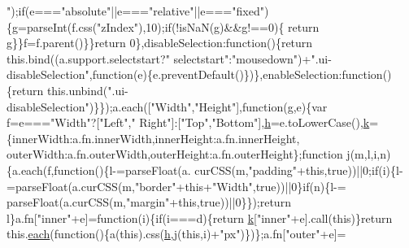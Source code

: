 \begin{DoxyCode}
{      "});\textcolor{keywordflow}{if}(e===\textcolor{stringliteral}{"absolute"}||e===\textcolor{stringliteral}{"relative"}||e===\textcolor{stringliteral}{"fixed"})\{g=parseInt(f.css(\textcolor{stringliteral}{"zIndex"}),10);\textcolor{keywordflow}{if}(!isNaN(g)&&g!==0)\{\textcolor{keywordflow}{
      return} g\}\}f=f.parent()\}\}\textcolor{keywordflow}{return} 0\},disableSelection:\textcolor{keyword}{function}()\{\textcolor{keywordflow}{return} this.bind((a.support.selectstart?\textcolor{stringliteral}{"
      selectstart"}:\textcolor{stringliteral}{"mousedown"})+\textcolor{stringliteral}{".ui-disableSelection"},\textcolor{keyword}{function}(e)\{e.preventDefault()\})\},enableSelection:\textcolor{keyword}{function}()\{\textcolor{keywordflow}{return} 
      this.unbind(\textcolor{stringliteral}{".ui-disableSelection"})\}\});a.each([\textcolor{stringliteral}{"Width"},\textcolor{stringliteral}{"Height"}],\textcolor{keyword}{function}(g,e)\{var f=e===\textcolor{stringliteral}{"Width"}?[\textcolor{stringliteral}{"Left"},\textcolor{stringliteral}{"
      Right"}]:[\textcolor{stringliteral}{"Top"},\textcolor{stringliteral}{"Bottom"}],\hyperlink{all__1a_8js_aebecdaf2444e2be39f4804412d6a3bf8}{h}=e.toLowerCase(),\hyperlink{jquery_8js_ab26645c014aa005ecedef329ecf58c99}{k}=\{innerWidth:a.fn.innerWidth,innerHeight:a.fn.innerHeight,
      outerWidth:a.fn.outerWidth,outerHeight:a.fn.outerHeight\};\textcolor{keyword}{function} j(m,l,i,n)\{a.each(f,\textcolor{keyword}{function}()\{l-=parseFloat(a.
      curCSS(m,\textcolor{stringliteral}{"padding"}+\textcolor{keyword}{this},\textcolor{keyword}{true}))||0;\textcolor{keywordflow}{if}(i)\{l-=parseFloat(a.curCSS(m,\textcolor{stringliteral}{"border"}+\textcolor{keyword}{this}+\textcolor{stringliteral}{"Width"},\textcolor{keyword}{true}))||0\}\textcolor{keywordflow}{if}(n)\{l-=
      parseFloat(a.curCSS(m,\textcolor{stringliteral}{"margin"}+\textcolor{keyword}{this},\textcolor{keyword}{true}))||0\}\});\textcolor{keywordflow}{return} l\}a.fn[\textcolor{stringliteral}{"inner"}+e]=\textcolor{keyword}{function}(i)\{\textcolor{keywordflow}{if}(i===d)\{\textcolor{keywordflow}{return} 
      \hyperlink{jquery_8js_ab26645c014aa005ecedef329ecf58c99}{k}[\textcolor{stringliteral}{"inner"}+e].call(\textcolor{keyword}{this})\}\textcolor{keywordflow}{return} this.\hyperlink{jquery_8js_a871ff39db627c54c710a3e9909b8234c}{each}(\textcolor{keyword}{function}()\{a(\textcolor{keyword}{this}).css(\hyperlink{all__1a_8js_aebecdaf2444e2be39f4804412d6a3bf8}{h},j(\textcolor{keyword}{this},i)+\textcolor{stringliteral}{"px"})\})\};a.fn[\textcolor{stringliteral}{"outer"}+e]=\textcolor{keyword}{
}
\end{DoxyCode}
